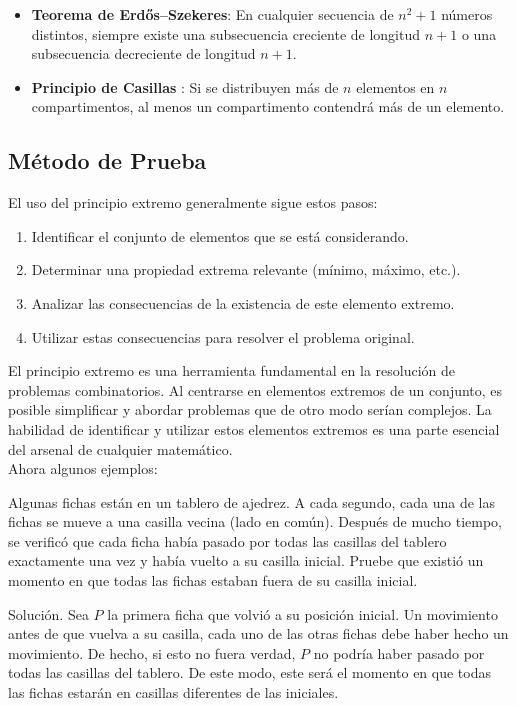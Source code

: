 \documentclass[11pt]{scrartcl}
\begin{document}
\begin{itemize}
    \item \textbf{Teorema de Erdős–Szekeres}: En cualquier secuencia de \(n^2 + 1\) números distintos, siempre existe una subsecuencia creciente de longitud \(n+1\) o una subsecuencia decreciente de longitud \(n+1\).
    \item \textbf{Principio de Casillas }: Si se distribuyen más de \(n\) elementos en \(n\) compartimentos, al menos un compartimento contendrá más de un elemento.
\end{itemize}

\subsection*{Método de Prueba}

El uso del principio extremo generalmente sigue estos pasos:

\begin{enumerate}
    \item Identificar el conjunto de elementos que se está considerando.
    \item Determinar una propiedad extrema relevante (mínimo, máximo, etc.).
    \item Analizar las consecuencias de la existencia de este elemento extremo.
    \item Utilizar estas consecuencias para resolver el problema original.
\end{enumerate}

El principio extremo es una herramienta fundamental en la resolución de problemas combinatorios. Al centrarse en elementos extremos de un conjunto, es posible simplificar y abordar problemas que de otro modo serían complejos. La habilidad de identificar y utilizar estos elementos extremos es una parte esencial del arsenal de cualquier matemático.\\

Ahora algunos ejemplos:

\begin{example}[Leningrado 1988]
    Algunas fichas están en un tablero de ajedrez. A cada segundo, cada una de las fichas se mueve a una casilla vecina (lado en común). Después de mucho tiempo, se verificó que cada ficha había pasado por todas las casillas del tablero exactamente una vez y había vuelto a su casilla inicial. Pruebe que existió un momento en que todas las fichas estaban fuera de su casilla inicial.
\end{example}
Solución. Sea \(P\) la primera ficha que volvió a su posición inicial. Un movimiento antes de que vuelva a su casilla, cada uno de las otras fichas debe haber hecho un movimiento. De hecho, si esto no fuera verdad, \(P\) no podría haber pasado por todas las casillas del tablero. De este modo, este será el momento en que todas las fichas estarán en casillas diferentes de las iniciales.
\end{document}
